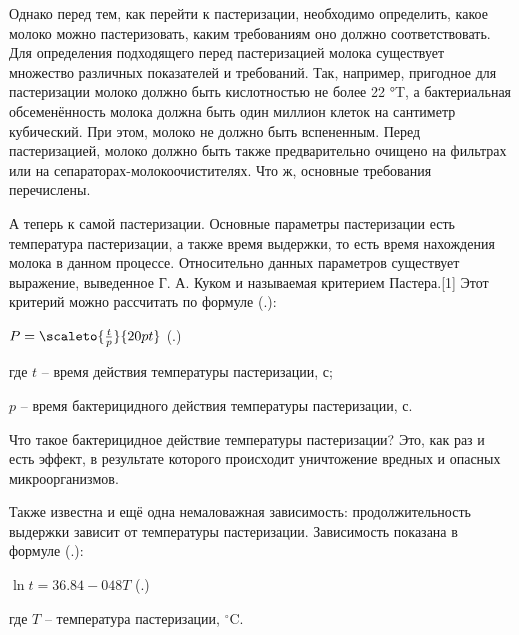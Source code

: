 {  \par \redline Однако перед тем, как перейти к пастеризации, необходимо определить, какое молоко можно пастеризовать, каким требованиям оно должно соответствовать. Для определения подходящего перед пастеризацией молока существует множество различных показателей и требований. Так, например, пригодное для пастеризации молоко должно быть кислотностью не более 22 °T, а бактериальная обсеменённость молока должна быть один миллион клеток на сантиметр кубический. При этом, молоко не должно быть вспененным. Перед пастеризацией, молоко должно быть также предварительно очищено на фильтрах или на сепараторах-молокоочистителях. Что ж, основные требования перечислены.

  \par \redline А теперь к самой пастеризации. Основные параметры пастеризации есть температура пастеризации, а также время выдержки, то есть время нахождения молока в данном процессе. Относительно данных параметров существует выражение, выведенное Г. А. Куком и называемая критерием Пастера.[1] Этот критерий можно рассчитать по формуле (\thechaptercntr .\theformulacntr):

	\formulaspace \par \redline
    $P=\scaleto{\frac{t}{p}}{20pt}$
    \hfill (\thechaptercntr .\theformulacntr) \redline
	\formulaspace \addtocounter{formulacntr}{1}

  \par \redline где $t$ {--} время действия температуры пастеризации, с;

  \par \redline \wherespace $p$ {--} время бактерицидного действия температуры пастеризации, с.

  \par \redline Что такое бактерицидное действие температуры пастеризации? Это, как раз и есть эффект, в результате которого происходит уничтожение вредных и опасных микроорганизмов.

  \par \redline Также известна и ещё одна немаловажная зависимость: продолжительность выдержки зависит от температуры пастеризации. Зависимость показана в формуле (\thechaptercntr .\theformulacntr):

  \formulaspace
	\par \redline $\ln{t} = 36.84 - 048T$ \hfill (\thechaptercntr .\theformulacntr) \redline
	\formulaspace \addtocounter{formulacntr}{1}

  \par \redline где $T$ {--} температура пастеризации, $^{\circ}$C.

}
